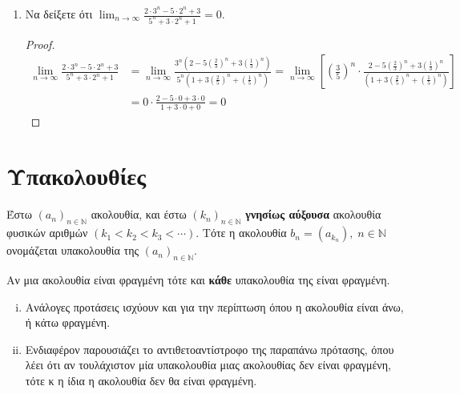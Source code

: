 \begin{enumerate}
  \item Να δείξετε ότι $ \lim_{n \to \infty} \frac{2\cdot 3^{n} -5 \cdot 2^{n} +
    3}{5^{n}+3 \cdot 2^{n}+1} = 0 $.
    \begin{proof}
      \begin{align*}
       \lim_{n \to \infty} \frac{2\cdot 3^{n} -5 \cdot 2^{n} + 3}{5^{n}+3 
       \cdot 2^{n}+1} 
       &= \lim_{n \to \infty} \frac{3^{n}\left(2-5(\frac{2}{3})^{n}+3(\frac{1}{3}
 )^{n}\right)}{5^{n}\left(1+3(\frac{2}{5} )^{n}+(\frac{1}{5} )^{n}\right)} = 
 \lim_{n \to \infty} \left[\left(\frac{3}{5} \right)^{n} \cdot \frac{2-5(\frac{2}{3})^{n}+3(\frac{1}{3}
 )^{n}}{\left(1+3(\frac{2}{5} )^{n}+(\frac{1}{5} )^{n}\right)}\right] \\
 &= 0\cdot \frac{2 - 5\cdot 0+ 3\cdot 0}{1+3\cdot 0 + 0} = 0
      \end{align*} 
    \end{proof}
\end{enumerate}

\section{Υπακολουθίες}

\begin{mybox1}
  \begin{dfn}
    Έστω $ (a_{n})_{n \in \mathbb{N}} $ ακολουθία, και έστω $ 
    (k_{n})_{n \in \mathbb{N}} $ \textbf{γνησίως αύξουσα} ακολουθία φυσικών αριθμών $ (k_{1}<k_{2}<k_{3}<\cdots) $. 
    Τότε η ακολουθία $ b_{n} = (a_{k_{n}}), \; n \in \mathbb{N} $ 
    ονομάζεται \textcolor{Col1}{υπακολουθία} της 
    $ (a_{n})_{n \in \mathbb{N}} $.
  \end{dfn}
\end{mybox1}


\begin{mybox3}
  \begin{prop}
    Αν μια ακολουθία είναι φραγμένη τότε και \textbf{κάθε} υπακολουθία της 
    είναι φραγμένη.
  \end{prop}
\end{mybox3}

\begin{rem}
\item {}
  \begin{enumerate}[i)]
    \item Ανάλογες προτάσεις ισχύουν και για την περίπτωση όπου η 
      ακολουθία είναι άνω, ή κάτω φραγμένη.
    \item 
      Ενδιαφέρον παρουσιάζει το αντιθετοαντίστροφο της παραπάνω 
      πρότασης, όπου λέει ότι αν τουλάχιστον μία υπακολουθία μιας 
      ακολουθίας δεν είναι φραγμένη, τότε κ η ίδια η ακολουθία 
      δεν θα είναι φραγμένη.
  \end{enumerate}
\end{rem}

